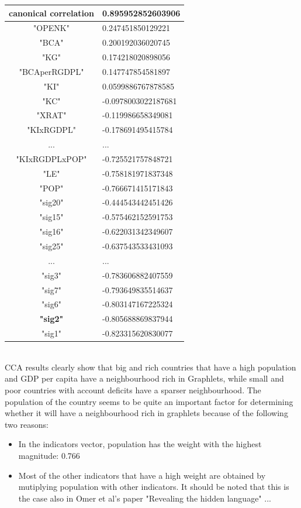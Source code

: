 \documentclass[11pt,a4paper,oneside]{report}
\begin{document}
\begin{tabular}{ c | l }
canonical correlation &  0.895952852603906\\
\hline
"OPENK" & 0.247451850129221\\
"BCA" & 0.200192036020745\\
"KG" & 0.174218020898056\\
"BCAperRGDPL" & 0.147747854581897\\
"KI" & 0.0599886767878585\\
"KC" & -0.0978003022187681\\
"XRAT" & -0.119986658349081\\
"KIxRGDPL" & -0.178691495415784\\
... & ...\\
"KIxRGDPLxPOP" & -0.725521757848721\\
"LE" & -0.758181971837348\\
"POP" & -0.766671415171843\\
\hline
"sig20" & -0.444543442451426\\
"sig15" & -0.575462152591753\\
"sig16" & -0.622031342349607\\
"sig25" & -0.637543533431093\\
... & ...\\
"sig3" & -0.783606882407559\\
"sig7" & -0.793649835514637\\
"sig6" & -0.803147167225324\\
\textbf{"sig2"} & -0.805688869837944\\
"sig1" & -0.823315620830077\\
\end{tabular}\\


CCA results clearly show that big and rich countries that have a high population and GDP per capita have a neighbourhood rich in Graphlets, while small and poor countries with account deficits have a sparser neighbourhood. The population of the country seems to be quite an important factor for determining whether it will have a neighbourhood rich in graphlets because of the following two reasons:
\begin{itemize}
 \item In the indicators vector, population has the weight with the highest magnitude: 0.766
 \item Most of the other indicators that have a high weight are obtained by mutiplying population with other indicators. It should be noted that this is the case also in Omer et al's paper "Revealing the hidden language" ...
\end{itemize}
\end{document}
